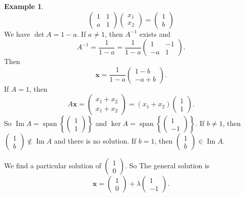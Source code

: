 \documentclass[a4paper]{article}
\theoremstyle{definition}
\newtheorem*{eg}{Example}
\newcommand{\mb}[1]{\mathbf{#1}}
\DeclareMathOperator\im{Im}
\DeclareMathOperator\spn{span}
\begin{document}
\begin{eg}
  \[
  \begin{pmatrix}
    1 & 1\\
    a & 1
  \end{pmatrix}
  \begin{pmatrix}
    x_1\\
    x_2
  \end{pmatrix} =
  \begin{pmatrix}
    1\\
    b
  \end{pmatrix}
  \]
  We have $\det A = 1 - a$. If $a \not= 1$, then $A^{-1}$ exists and
  \[
  A^{-1} = \frac{1}{1 - a} = \frac{1}{1 - a}\begin{pmatrix}
    1 & -1\\
    -a & 1
  \end{pmatrix}.
  \]
  Then
  \[
  \mb{x} = \frac{1}{1- a}\begin{pmatrix}
    1 - b\\
    -a + b
  \end{pmatrix}.
  \]
  If $A = 1$, then
  \[
  A\mb{x} = \begin{pmatrix}
    x_1 + x_2\\
    x_1 + x_2
  \end{pmatrix} = (x_1 + x_2)\begin{pmatrix}
    1\\
    1
  \end{pmatrix}.
  \]
  So $\im A = \spn\left\{
  \begin{pmatrix}
    1\\1
  \end{pmatrix}
  \right\}$ and $\ker A = \spn\left\{
  \begin{pmatrix}
    1\\-1
  \end{pmatrix}
  \right\}$. If $b \not=1 $, then $\begin{pmatrix}
    1\\b
  \end{pmatrix}
  \not\in \im A$ and there is no solution. If $b = 1$, then $
  \begin{pmatrix}
    1\\b
  \end{pmatrix}
  \in \im A$.

  We find a particular solution of
  $\begin{pmatrix}
    1\\
    0
  \end{pmatrix}$. So The general solution is
  \[
  \mb{x} =
  \begin{pmatrix}
    1\\0
  \end{pmatrix}
  + \lambda
  \begin{pmatrix}
    1\\-1
  \end{pmatrix}.
  \]
\end{eg}
\end{document}
